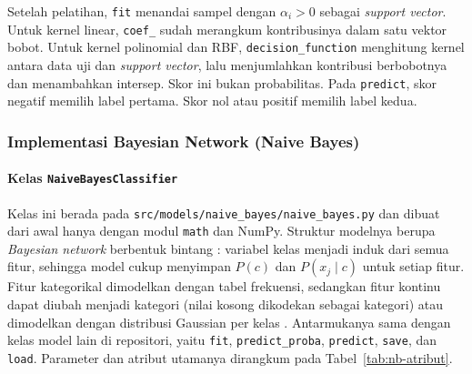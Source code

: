 Setelah pelatihan, \texttt{fit} menandai sampel dengan $\alpha_i>0$ sebagai
\textit{support vector}. Untuk kernel linear, \texttt{coef\_} sudah
merangkum kontribusinya dalam satu vektor bobot. Untuk kernel polinomial
dan RBF, \texttt{decision\_function} menghitung kernel antara data uji dan
\textit{support vector}, lalu menjumlahkan kontribusi berbobotnya dan
menambahkan intersep. Skor ini bukan probabilitas. Pada \texttt{predict},
skor negatif memilih label pertama. Skor nol atau positif memilih label
kedua.

\subsubsection{Implementasi Bayesian Network (Naive Bayes)}

\paragraph{Kelas \texttt{NaiveBayesClassifier}}
Kelas ini berada pada \texttt{src/models/\allowbreak naive\_\allowbreak bayes/\allowbreak naive\_\allowbreak bayes.py} dan dibuat dari awal hanya dengan modul \texttt{math} dan NumPy. Struktur modelnya berupa \textit{Bayesian network} berbentuk bintang \cite{ref:materi-14}: variabel kelas menjadi induk dari semua fitur, sehingga model cukup menyimpan $P(c)$ dan $P(x_j\mid c)$ untuk setiap fitur. Fitur kategorikal dimodelkan dengan tabel frekuensi, sedangkan fitur kontinu dapat diubah menjadi kategori (nilai kosong dikodekan sebagai kategori) atau dimodelkan dengan distribusi Gaussian per kelas \cite{ref:john-1995}. Antarmukanya sama dengan kelas model lain di repositori, yaitu \texttt{fit}, \texttt{predict\_proba}, \texttt{predict}, \texttt{save}, dan \texttt{load}. Parameter dan atribut utamanya dirangkum pada Tabel~\ref{tab:nb-atribut}.

